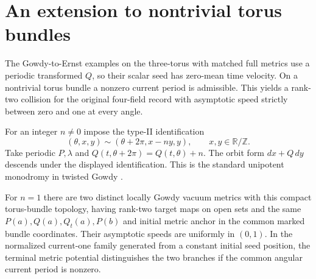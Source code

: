 \section{An extension to nontrivial torus bundles}
\label{sec:twisted}
The Gowdy-to-Ernst examples on the three-torus with
matched full metrics use a periodic transformed $Q$,
so their scalar seed has zero-mean time velocity.
On a nontrivial torus bundle a nonzero current period is
admissible. This yields a rank-two collision for the
original four-field record with asymptotic speed
strictly between zero and one at every angle.

For an integer $n\ne0$ impose the type-II identification
\[
 (\theta,x,y)\sim(\theta+2\pi,x-ny,y),
 \qquad x,y\in\mathbb R/\mathbb Z.
\]
Take periodic $P,\lambda$ and
$Q(t,\theta+2\pi)=Q(t,\theta)+n$.
The orbit form $dx+Q\,dy$ descends under the displayed
identification. This is the standard unipotent
monodromy in twisted Gowdy \cite{rendall-twisted}.

\begin{proposition}
\label{prop:twisted}
For $n=1$ there are two distinct locally Gowdy vacuum
metrics with this compact torus-bundle topology, having
rank-two target maps on open sets and the same
$P(a),Q(a),Q_t(a),P(b)$ and initial metric anchor
in the common marked bundle coordinates.
Their asymptotic speeds are uniformly in $(0,1)$.
In the normalized current-one family generated from a
constant initial seed position, the terminal metric
potential distinguishes the two branches if the common
angular current period is nonzero.
\end{proposition}

